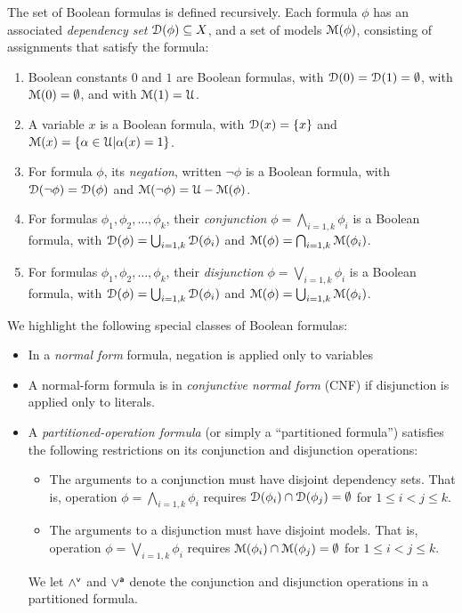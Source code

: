 \documentclass[letterpaper,USenglish,cleveref, autoref, thm-restate]{lipics-v2021}
\newcommand{\pand}{\mathbin{\land^{\sf v}}}
\newcommand{\por}{\mathbin{\lor^{\sf a}}}
\newcommand{\boolnot}{\neg}
\newcommand{\varset}{X}
\newcommand{\dependencyset}{{\cal D}}
\newcommand{\assign}{\alpha}
\newcommand{\uassign}{{\cal U}}
\newcommand{\modelset}{{\cal M}}
\begin{document}
  The set of Boolean formulas is defined recursively.  Each
  formula $\phi$ has an associated {\em dependency set}
  $\dependencyset(\phi)  \subseteq \varset$, and a set of models $\modelset(\phi)$,
  consisting of assignments that satisfy the formula:
  \begin{enumerate}
  \item Boolean constants $0$ and $1$ are Boolean formulas,
    with $\dependencyset(0) = \dependencyset(1) = \emptyset$, with $\modelset(0) = \emptyset$, and with $\modelset(1) = \uassign$.
  \item A variable $x$ is a Boolean formula, with $\dependencyset(x) = \{x\}$
    and $\modelset(x) = \{\assign \in \uassign | \assign(x)=1\}$.
  \item For formula $\phi$, its {\em negation}, written $\boolnot \phi$ is a Boolean formula,
    with $\dependencyset(\boolnot \phi) = \dependencyset(\phi)$ and $\modelset(\boolnot \phi) = \uassign - \modelset(\phi)$.
  \item For formulas $\phi_1, \phi_2, \ldots, \phi_k$, their {\em conjunction} $\phi = \bigwedge_{i=1,k} \phi_i$ is a Boolean formula, with
      $\dependencyset(\phi) = \bigcup_{i=1,k} \dependencyset(\phi_i)$ and
      $\modelset(\phi) = \bigcap_{i=1,k} \modelset(\phi_i)$.
  \item For formulas $\phi_1, \phi_2, \ldots, \phi_k$, their {\em disjunction} $\phi = \bigvee_{i=1,k} \phi_i$ is a Boolean formula, with
      $\dependencyset(\phi) = \bigcup_{i=1,k} \dependencyset(\phi_i)$ and
      $\modelset(\phi) = \bigcup_{i=1,k} \modelset(\phi_i)$.
  \end{enumerate}
  
  We highlight the following special classes of Boolean formulas:
  \begin{itemize}
    \item In a {\em normal form} formula, negation is 
      applied only to variables
    \item A normal-form formula is in {\em conjunctive normal form} (CNF) if disjunction is applied only to literals.
    \item A {\em partitioned-operation formula} (or simply a ``partitioned formula'') satisfies the following restrictions on its conjunction and disjunction operations:
      \begin{itemize}
      \item The arguments to a conjunction must have disjoint dependency sets.  That is, operation
        $\phi = \bigwedge_{i=1,k} \phi_i$ requires $\dependencyset(\phi_i) \cap \dependencyset(\phi_j) = \emptyset$ for $1 \leq i < j \leq k$.
      \item The arguments to a disjunction must have disjoint models.  That is, operation
        $\phi = \bigvee_{i=1,k} \phi_i$ requires $\modelset(\phi_i) \cap \modelset(\phi_j) = \emptyset$ for $1 \leq i < j \leq k$.
      \end{itemize}
     We let $\pand$ and $\por$ denote the conjunction and disjunction operations in a partitioned formula.
  \end{itemize}
  
\end{document}
